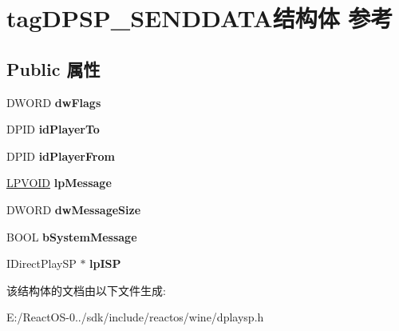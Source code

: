 \hypertarget{structtag_d_p_s_p___s_e_n_d_d_a_t_a}{}\section{tag\+D\+P\+S\+P\+\_\+\+S\+E\+N\+D\+D\+A\+T\+A结构体 参考}
\label{structtag_d_p_s_p___s_e_n_d_d_a_t_a}
\subsection*{Public 属性}
\begin{DoxyCompactItemize}
\item 
\mbox{\label{structtag_d_p_s_p___s_e_n_d_d_a_t_a_a8d796e89b94bd398d9e0818a99a56247}} 
D\+W\+O\+RD {\bfseries dw\+Flags}
\item 
\mbox{\label{structtag_d_p_s_p___s_e_n_d_d_a_t_a_a856f5a93a93cbf7005662f38971d742b}} 
D\+P\+ID {\bfseries id\+Player\+To}
\item 
\mbox{\label{structtag_d_p_s_p___s_e_n_d_d_a_t_a_a77083220c26ae9218f3511685d556957}} 
D\+P\+ID {\bfseries id\+Player\+From}
\item 
\mbox{\label{structtag_d_p_s_p___s_e_n_d_d_a_t_a_aa6148bb3d1535dfe8a08535f9bd52cdb}} 
\hyperlink{interfacevoid}{L\+P\+V\+O\+ID} {\bfseries lp\+Message}
\item 
\mbox{\label{structtag_d_p_s_p___s_e_n_d_d_a_t_a_a018770f2c44084cccd66b1b4cda02c82}} 
D\+W\+O\+RD {\bfseries dw\+Message\+Size}
\item 
\mbox{\label{structtag_d_p_s_p___s_e_n_d_d_a_t_a_a1df1447863bac5c14a2267797e2c7c63}} 
B\+O\+OL {\bfseries b\+System\+Message}
\item 
\mbox{\label{structtag_d_p_s_p___s_e_n_d_d_a_t_a_a71adefe71577e8372b0e37876a466319}} 
I\+Direct\+Play\+SP $\ast$ {\bfseries lp\+I\+SP}
\end{DoxyCompactItemize}


该结构体的文档由以下文件生成\+:\begin{DoxyCompactItemize}
\item 
E\+:/\+React\+O\+S-\/0../sdk/include/reactos/wine/dplaysp.\+h\end{DoxyCompactItemize}
